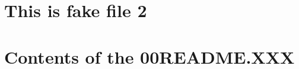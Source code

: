 \documentclass{article}
\begin{document}
\section*{This is fake file 2}

\section*{Contents of the 00README.XXX}

\end{document}
